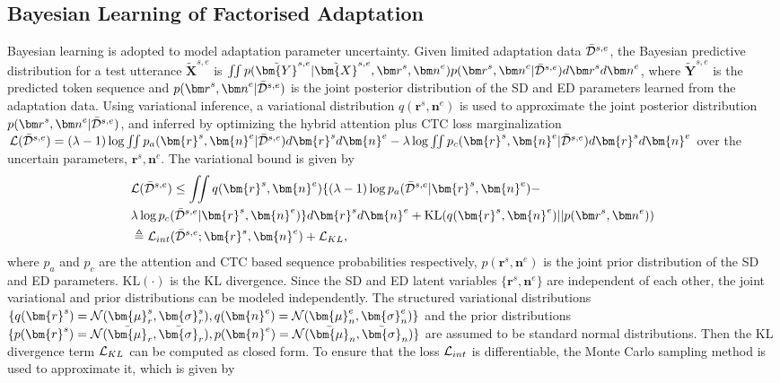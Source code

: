 \documentclass{INTERSPEECH2023}
\begin{document}
\vspace{-0.2cm}
\subsection{Bayesian Learning of Factorised Adaptation}
Bayesian learning\cite{mackay1992practical} is adopted to model adaptation parameter uncertainty. Given limited adaptation data $\bar{{\cal D}}^{s,e}$, the Bayesian predictive distribution for a test utterance $\tilde{\bm{X}}^{s,e}$ is $\iint{p(\tilde{\bm{Y}}^{s,e}|\tilde{\bm{X}}^{s,e},{\bm r}^s,{\bm n}^e)p({\bm r}^s,{\bm n}^e|\bar{{\cal D}}^{s,e})d{\bm r}^s}d{\bm n}^e$,
where ${\tilde{\bm Y}}^{s,e}$ is the predicted token sequence and $p({\bm r}^s,{\bm n}^e|\bar{{\cal D}}^{s,e})$ is the joint posterior distribution of the SD and ED parameters learned from the adaptation data. Using variational inference, a variational distribution $q(\bm{r}^s,\bm{n}^e)$ is used to approximate the joint posterior distribution $p({\bm r}^s,{\bm n}^e|\bar{{\cal D}}^{s,e})$, and inferred by optimizing the hybrid attention plus CTC loss marginalization ${\cal L}(\bar{\cal {D}}^{s,e})=(\lambda-1)\log\iint p_a(\bm{r}^s, \bm{n}^e|\bar{\cal {D}}^{s,e})d\bm{r}^sd\bm{n}^e-\lambda\log\iint p_c(\bm{r}^s, \bm{n}^e|\bar{\cal {D}}^{s,e})d\bm{r}^sd\bm{n}^e$ over the uncertain parameters, ${\bm r}^s,{\bm n}^e$. The variational bound is given by
\begin{align}
\setlength{\abovedisplayskip}{2pt plus 1pt minus 1pt}
\setlength{\belowdisplayskip}{2pt plus 1pt minus 1pt}
&{\cal L}(\bar{\cal {D}}^{s,e})\leq \iint q(\bm{r}^s,\bm{n}^e)\{(\lambda-1)\log p_a(\bar{\cal {D}}^{s,e}|\bm{r}^s, \bm{n}^e) - \nonumber\\
&\lambda\log p_c(\bar{\cal {D}}^{s,e}|\bm{r}^s, \bm{n}^e)\}d\bm{r}^sd\bm{n}^e + \text {KL}(q(\bm{r}^{s}, \bm{n}^e)||p({\bm r}^s,{\bm n}^e)) \nonumber\\
&\triangleq {\cal L}_{int}(\bar{\cal {D}}^{s,e};\bm{r}^s, \bm{n}^e) + {\cal L}_{KL},
\end{align}
where $p_a$ and $p_c$ are the attention and CTC based sequence probabilities respectively, $p({\bm r}^s,{\bm n}^e)$ is the joint prior distribution of the SD and ED parameters. KL$(\cdot)$ is the KL divergence. Since the SD and ED latent variables $\{\bm{r}^s,\bm{n}^e\}$ are independent of each other, the joint variational and prior distributions can be modeled independently. The structured variational distributions $\{q(\bm{r}^s)={\cal N}(\bm{\mu}_r^{s},\bm{\sigma}_r^{s}),q(\bm{n}^e)={\cal N}(\bm{\mu}_n^{e},\bm{\sigma}_n^{e})\}$ and the prior distributions $\{p(\bm{r}^s)={\cal N}(\bar{\bm{\mu}}_r,\bar{\bm{\sigma}}_r),p(\bm{n}^e)={\cal N}(\bar{\bm{\mu}}_n,\bar{\bm{\sigma}}_n)\}$ are assumed to be standard normal distributions. Then the KL divergence term ${\cal L}_{KL}$ can be computed as closed form\cite{deng2023confidence}. To ensure that the loss ${\cal L}_{int}$ is differentiable, the Monte Carlo sampling method is used to approximate it, which is given by
\end{document}
